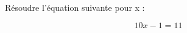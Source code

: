 \documentclass{article}
\begin{document}
Résoudre l'équation suivante pour x :

\[10x - 1 = 11\]
\end{document}
